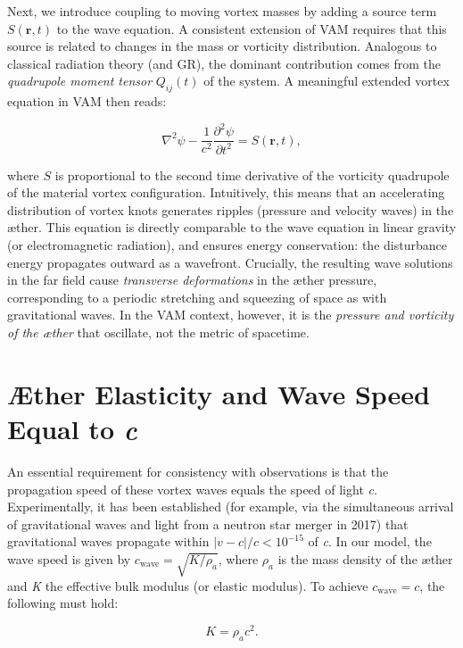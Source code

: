 Next, we introduce coupling to moving vortex masses by adding a source term $S(\mathbf{r},t)$ to the wave equation. A consistent extension of VAM requires that this source is related to changes in the mass or vorticity distribution. Analogous to classical radiation theory (and GR), the dominant contribution comes from the \textit{quadrupole moment tensor} $Q_{ij}(t)$ of the system. A meaningful extended vortex equation in VAM then reads:

\[
\nabla^2 \psi - \frac{1}{c^2} \frac{\partial^2 \psi}{\partial t^2} = S(\mathbf{r},t),
\]

where $S$ is proportional to the second time derivative of the vorticity quadrupole of the material vortex configuration. Intuitively, this means that an accelerating distribution of vortex knots generates ripples (pressure and velocity waves) in the æther. This equation is directly comparable to the wave equation in linear gravity (or electromagnetic radiation), and ensures energy conservation: the disturbance energy propagates outward as a wavefront. Crucially, the resulting wave solutions in the far field cause \textit{transverse deformations} in the æther pressure, corresponding to a periodic stretching and squeezing of space as with gravitational waves. In the VAM context, however, it is the \textit{pressure and vorticity of the æther} that oscillate, not the metric of spacetime.

\section*{Æther Elasticity and Wave Speed Equal to \textit{c}}
An essential requirement for consistency with observations is that the propagation speed of these vortex waves equals the speed of light \textit{c}. Experimentally, it has been established (for example, via the simultaneous arrival of gravitational waves and light from a neutron star merger in 2017) that gravitational waves propagate within $|v-c|/c < 10^{-15}$ of \textit{c}. In our model, the wave speed is given by $c_\text{wave} = \sqrt{K/\rho_a}$, where $ρ_a$ is the mass density of the æther and \textit{K} the effective bulk modulus (or elastic modulus). To achieve $c_\text{wave} = c$, the following must hold:

\[
K = \rho_a c^2.
\]


